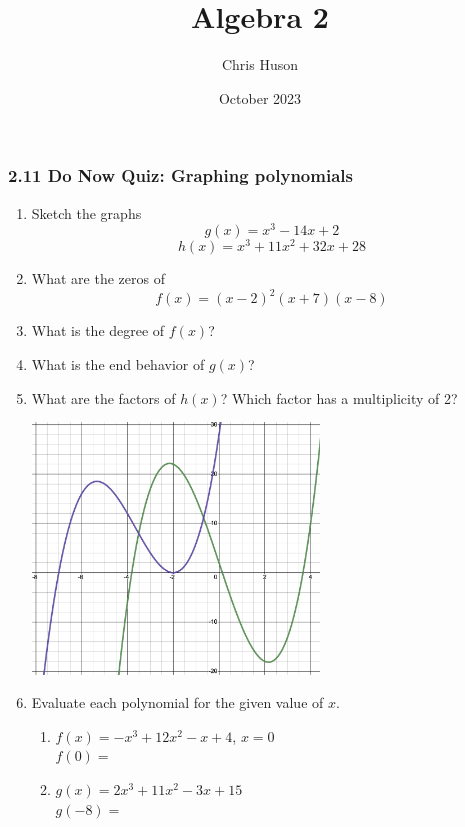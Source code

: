 \documentclass[12pt, twoside]{article}
\title{Algebra 2}
\author{Chris Huson}
\date{October 2023}
\begin{document}
\subsubsection*{2.11 Do Now Quiz: Graphing polynomials}
\begin{enumerate}
    \item Sketch the graphs
        $$g\left(x\right)=x^{3}-14x+2$$
        $$h\left(x\right)=x^{3}+11x^{2}+32x+28$$
    \item What are the zeros of $$f(x)=(x-2)^2 (x+7)(x-8)$$
    \item What is the degree of $f(x)$?
    \item What is the end behavior of $g(x)$?
    \item What are the factors of $h(x)$?
    Which factor has a multiplicity of 2?

    \begin{center}
        \includegraphics[width=0.6\textwidth]{../graphics/2-11DNQ-graphs.png}
    \end{center}


\newpage
    \item Evaluate each polynomial for the given value of $x$.
    \begin{multicols}{2}
        \begin{enumerate}[itemsep=1cm]
            \item $f(x)=-x^3+12x^2-x+4$, $x=0$ \\[0.25cm] 
            $f(0) = $ \vspace{2cm}
            \item $g(x)=2x^3+11x^2-3x+15$ \\[0.25cm] 
            $g(-8) = $ \vspace{2cm}
        \end{enumerate}
        \end{multicols}
    

\end{enumerate}
\end{document}
